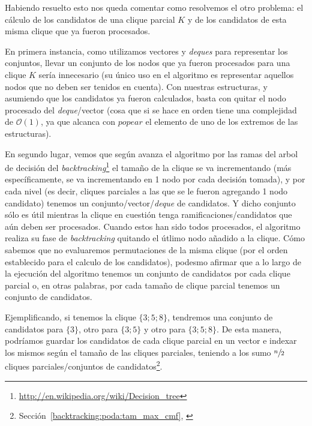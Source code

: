\par Habiendo resuelto esto nos queda comentar como resolvemos el otro problema:
    el c\'alculo de los candidatos de una clique parcial $K$ y de los candidatos
    de esta misma clique que ya fueron procesados.

\par En primera instancia, como utilizamos vectores y \emph{deques} para representar
    los conjuntos, llevar un conjunto de los nodos que ya fueron procesados para una
    clique $K$ ser\'ia innecesario (su \'unico uso en el algoritmo es representar
    aquellos nodos que no deben ser tenidos en cuenta). Con nuestras estructuras,
    y asumiendo que los candidatos ya fueron calculados, basta con quitar el nodo
    procesado del \emph{deque}/vector (cosa que si se hace en orden tiene una complejidad
    de $\mathcal O(1)$, ya que alcanca con $popear$ el elemento de uno de los extremos
    de las estructuras).

\par En segundo lugar, vemos que seg\'un avanza el algoritmo por las ramas del
    arbol de decisi\'on del \emph{backtracking}\footnote{\url{http://en.wikipedia.org/wiki/Decision_tree}}
    el tama\~no de la clique se va incrementando (m\'as espec\'ificamente, se va
    incrementando en 1 nodo por cada decisi\'on tomada), y por cada nivel (es decir,
    cliques parciales a las que se le fueron agregando 1 nodo candidato) tenemos
    un conjunto/vector/\emph{deque} de candidatos. Y dicho conjunto s\'olo es
    \'util mientras la clique en cuesti\'on tenga ramificaciones/candidatos
    que a\'un deben ser procesados. Cuando estos han sido todos procesados, el
    algoritmo realiza su fase de \emph{backtracking} quitando el \'utlimo
    nodo a\~nadido a la clique. C\'omo sabemos que no evaluaremos permutaciones
    de la misma clique (por el orden establecido para el calculo de los candidatos),
    podesmo afirmar que a lo largo de la ejecuci\'on del algoritmo tenemos
    un conjunto de candidatos por cada clique parcial o, en otras palabras,
    por cada tama\~no de clique parcial tenemos un conjunto de candidatos.

\par Ejemplificando, si tenemos la clique $\{3;5;8\}$, tendremos una conjunto
    de candidatos para $\{3\}$, otro para $\{3;5\}$ y otro para $\{3;5;8\}$.
    De esta manera, podr\'iamos guardar los candidatos de cada clique parcial
    en un vector e indexar los mismos seg\'un el tama\~no de las cliques
    parciales, teniendo a los sumo $\sfrac{n}{2}$ cliques parciales/conjuntos
    de candidatos\footnote{Secci\'on~\ref{backtracking:poda:tam_max_cmf},
    \emph{}}.

